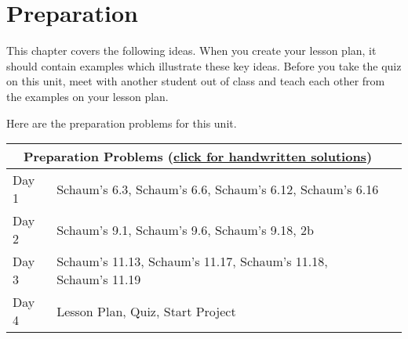 \section{Preparation}

\noindent
This chapter covers the following ideas. When you create your lesson plan, it should contain examples which illustrate these key ideas. Before you take the quiz on this unit, meet with another student out of class and teach each other from the examples on your lesson plan. 



Here are the preparation problems for this unit.

\begin{center}
\begin{tabular}{ll|l}
\multicolumn{2}{c}{Preparation Problems (\href{http://ilearn.byui.edu/bbcswebdav/institution/Physical\_Sci\_Eng/Mathematics/Personal\%20Folders/WoodruffB/341/5-All-Solutions.pdf}{click for handwritten solutions})}
\\
\hline\hline
Day 1& Schaum's 6.3, Schaum's 6.6, Schaum's 6.12, Schaum's 6.16
\\ \hline
Day 2& 
Schaum's 9.1, Schaum's 9.6, Schaum's 9.18, 2b
\\ \hline
Day 3& 
Schaum's 11.13, Schaum's 11.17, Schaum's 11.18, Schaum's 11.19
\\ \hline
Day 4&
Lesson Plan,
Quiz, Start Project 
&
\\ \hline
\end{tabular}
\end{center}


